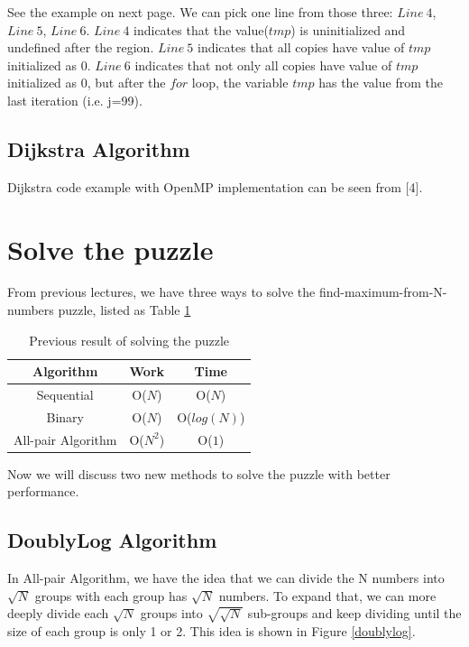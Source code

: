 \documentclass[twoside]{article}
\renewcommand{\cite}[1]{[#1]}
\begin{document}
See the example on next page. We can pick one line from those three: $Line\ 4$, $Line\ 5$, $Line\ 6$. $Line\ 4$ indicates that the value($tmp$) is uninitialized and undefined after the region. $Line\ 5$ indicates that all copies have value of $tmp$ initialized as 0. $Line\ 6$ indicates that not only all copies have value of $tmp$ initialized as 0, but after the $for$ loop, the variable $tmp$ has the value from the last iteration (i.e. j=99). 

\subsection{Dijkstra Algorithm}
Dijkstra code example with OpenMP implementation can be seen from \cite{4}.

\section{Solve the puzzle}

From previous lectures, we have three ways to solve the find-maximum-from-N-numbers puzzle, listed as Table \ref{table:1}
\begin{table}[H]
    \centering
    \begin{tabular}{ |c||c|c| } 
        \hline
        Algorithm & Work & Time \\
        \hline
        \hline
        Sequential & O($N$) & O($N$) \\ 
        \hline
        Binary & O($N$) & O($log(N)$) \\ 
        \hline
        All-pair Algorithm & O($N^2$) & O($1$) \\   
        \hline
    \end{tabular}
    \caption{Previous result of solving the puzzle}
    \label{table:1}
\end{table}

Now we will discuss two new methods to solve the puzzle with better performance.

\subsection{DoublyLog Algorithm}

In All-pair Algorithm, we have the idea that we can divide the N numbers into $\sqrt{N}$ groups with each group has $\sqrt{N}$ numbers. To expand that, we can more deeply divide each $\sqrt{N}$ groups into $\sqrt{\sqrt{N}}$ sub-groups and keep dividing until the size of each group is only 1 or 2. This idea is shown in Figure \ref{doublylog}.
\end{document}

